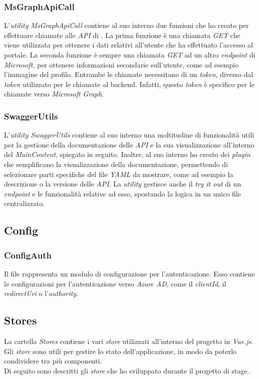 \subsubsection{MsGraphApiCall}\label{subsubsec:ms-graph-api-call}
L'\textit{utility MsGraphApiCall} contiene al suo interno due funzioni che ho creato per effettuare chiamate alle \textit{API} di . 
La prima funzione è una chiamata \textit{GET} che viene utilizzata per ottenere i dati relativi all'utente che ha effettuato l'accesso al portale.
La seconda funzione è sempre una chiamata \textit{GET} ad un altro \textit{endpoint} di \textit{Microsoft}, per ottenere informazioni secondarie sull'utente, come ad esempio l'immagine del profilo.
Entrambe le chiamate necessitano di un \textit{token}, diverso dal \textit{token} utilizzato per le chiamate al backend. Infatti, questo \textit{token} è specifico per le chiamate verso \textit{Microsoft Graph}.

\subsubsection{SwaggerUtils}\label{subsubsec:swagger-utils}
L'\textit{utility SwaggerUtils} contiene al suo interno una moltitudine di funzionalità utili per la gestione della documentazione delle \textit{API} e la sua visualizzazione all'interno
del \textit{MainContent}, spiegato in seguito.
Inoltre, al suo interno ho creato dei \textit{plugin} che semplificano la visualizzazione della documentazione, permettendo di selezionare parti specifiche del file \textit{YAML} da mostrare, come ad esempio la descrizione o la versione delle \textit{API}.
La \textit{utility} gestisce anche il \textit{try it out} di un \textit{endpoint} e le funzionalità relative ad esso, spostando la logica in un unico file centralizzato.
\subsection{Config}\label{subsec:config}
\subsubsection{ConfigAuth}\label{subsubsec:config-auth}
Il file rappresenta un modulo di configurazione per l'autenticazione. Esso contiene le configurazioni per l'autenticazione verso \textit{Azure AD},
come il \textit{clientId}, il \textit{redirectUri} o l'\textit{authority}.  

\subsection{Stores}\label{subsec:store}
La cartella \textit{Stores} contiene i vari \textit{store} utilizzati all'interno del progetto in \textit{Vue.js}. Gli \textit{store} sono utili per gestire lo stato dell'applicazione,
in modo da poterlo condividere tra più componenti.\\
Di seguito sono descritti gli \textit{store} che ho sviluppato durante il progetto di stage.

